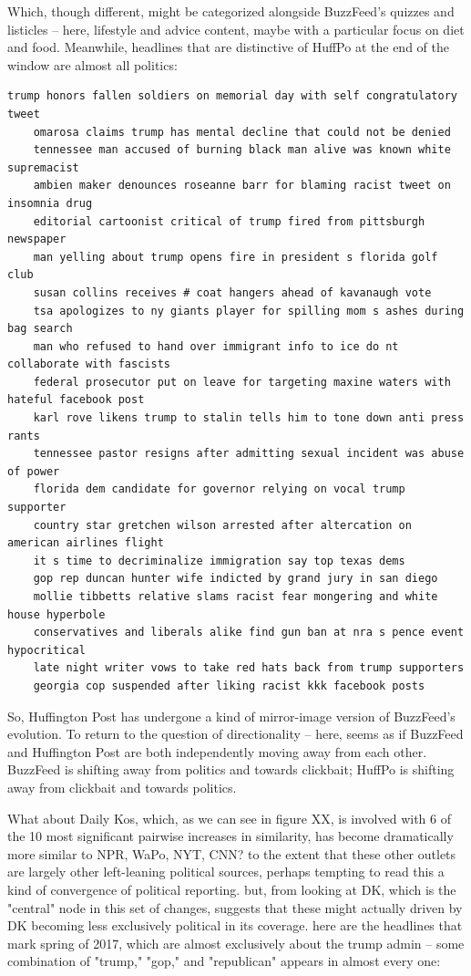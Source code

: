 \documentclass{scrartcl}
\begin{document}
Which, though different, might be categorized alongside BuzzFeed's quizzes and listicles -- here, lifestyle and advice content, maybe with a particular focus on diet and food. Meanwhile, headlines that are distinctive of HuffPo at the end of the window are almost all politics:

\begin{lstlisting}[basicstyle=\tiny\hlfont]
    trump honors fallen soldiers on memorial day with self congratulatory tweet
    omarosa claims trump has mental decline that could not be denied
    tennessee man accused of burning black man alive was known white supremacist
    ambien maker denounces roseanne barr for blaming racist tweet on insomnia drug
    editorial cartoonist critical of trump fired from pittsburgh newspaper
    man yelling about trump opens fire in president s florida golf club
    susan collins receives # coat hangers ahead of kavanaugh vote
    tsa apologizes to ny giants player for spilling mom s ashes during bag search
    man who refused to hand over immigrant info to ice do nt collaborate with fascists
    federal prosecutor put on leave for targeting maxine waters with hateful facebook post
    karl rove likens trump to stalin tells him to tone down anti press rants
    tennessee pastor resigns after admitting sexual incident was abuse of power
    florida dem candidate for governor relying on vocal trump supporter
    country star gretchen wilson arrested after altercation on american airlines flight
    it s time to decriminalize immigration say top texas dems
    gop rep duncan hunter wife indicted by grand jury in san diego
    mollie tibbetts relative slams racist fear mongering and white house hyperbole
    conservatives and liberals alike find gun ban at nra s pence event hypocritical
    late night writer vows to take red hats back from trump supporters
    georgia cop suspended after liking racist kkk facebook posts
\end{lstlisting}

So, Huffington Post has undergone a kind of mirror-image version of BuzzFeed's evolution. To return to the question of directionality -- here, seems as if BuzzFeed and Huffington Post are both independently moving away from each other. BuzzFeed is shifting away from politics and towards clickbait; HuffPo is shifting away from clickbait and towards politics.

What about Daily Kos, which, as we can see in figure XX, is involved with 6 of the 10 most significant pairwise increases in similarity, has become dramatically more similar to NPR, WaPo, NYT, CNN? to the extent that these other outlets are largely other left-leaning political sources, perhaps tempting to read this a kind of convergence of political reporting. but, from looking at DK, which is the "central" node in this set of changes, suggests that these might actually driven by DK becoming less exclusively political in its coverage. here are the headlines that mark spring of 2017, which are almost exclusively about the trump admin -- some combination of "trump," "gop," and "republican" appears in almost every one:
\end{document}
